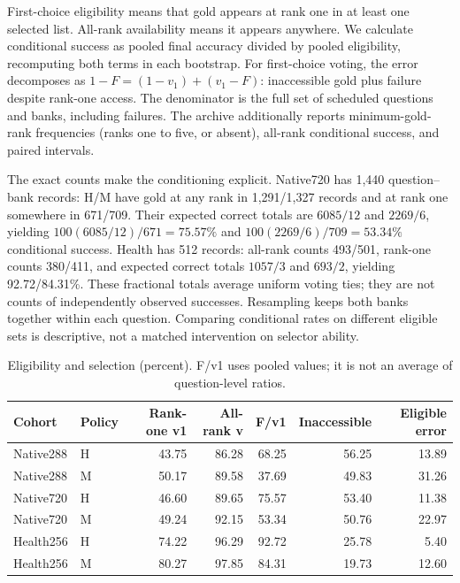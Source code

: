First-choice eligibility means that gold appears at rank one in at least one selected list. All-rank availability means it appears anywhere. We calculate conditional success as pooled final accuracy divided by pooled eligibility, recomputing both terms in each bootstrap. For first-choice voting, the error decomposes as $1-F=(1-v_1)+(v_1-F)$: inaccessible gold plus failure despite rank-one access. The denominator is the full set of scheduled questions and banks, including failures. The archive additionally reports minimum-gold-rank frequencies (ranks one to five, or absent), all-rank conditional success, and paired intervals.

The exact counts make the conditioning explicit. Native720 has 1,440 question--bank records: H/M have gold at any rank in 1,291/1,327 records and at rank one somewhere in 671/709. Their expected correct totals are $6085/12$ and $2269/6$, yielding $100(6085/12)/671=75.57\%$ and $100(2269/6)/709=53.34\%$ conditional success. Health has 512 records: all-rank counts 493/501, rank-one counts 380/411, and expected correct totals $1057/3$ and $693/2$, yielding 92.72/84.31\%. These fractional totals average uniform voting ties; they are not counts of independently observed successes. Resampling keeps both banks together within each question. Comparing conditional rates on different eligible sets is descriptive, not a matched intervention on selector ability.

\begin{table}[ht]
\centering\small
\caption{Eligibility and selection (percent). F/v1 uses pooled values; it is not an average of question-level ratios.}
\begin{tabular}{llrrrrr}
\toprule
Cohort & Policy & Rank-one v1 & All-rank v & F/v1 & Inaccessible & Eligible error\\
\midrule
Native288 & H & 43.75 & 86.28 & 68.25 & 56.25 & 13.89\\
Native288 & M & 50.17 & 89.58 & 37.69 & 49.83 & 31.26\\
Native720 & H & 46.60 & 89.65 & 75.57 & 53.40 & 11.38\\
Native720 & M & 49.24 & 92.15 & 53.34 & 50.76 & 22.97\\
Health256 & H & 74.22 & 96.29 & 92.72 & 25.78 & 5.40\\
Health256 & M & 80.27 & 97.85 & 84.31 & 19.73 & 12.60\\
\bottomrule
\end{tabular}
\end{table}

